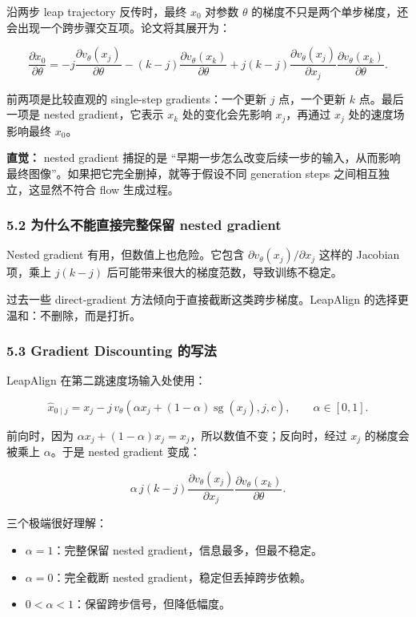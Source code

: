 沿两步 leap trajectory 反传时，最终 \(x_0\) 对参数 \(\theta\) 的梯度不只是两个单步梯度，还会出现一个跨步骤交互项。论文将其展开为：

\[
\frac{\partial x_0}{\partial \theta}
=
- j\frac{\partial v_{\theta}(x_j)}{\partial \theta}
-
(k-j)\frac{\partial v_{\theta}(x_k)}{\partial \theta}
+
j(k-j)
\frac{\partial v_{\theta}(x_j)}{\partial x_j}
\frac{\partial v_{\theta}(x_k)}{\partial \theta}.
\]

前两项是比较直观的 single-step gradients：一个更新 \(j\) 点，一个更新 \(k\) 点。最后一项是 nested gradient，它表示 \(x_k\) 处的变化会先影响 \(x_j\)，再通过 \(x_j\) 处的速度场影响最终 \(x_0\)。

\begin{intubox}
\textbf{直觉：} nested gradient 捕捉的是 ``早期一步怎么改变后续一步的输入，从而影响最终图像''。如果把它完全删掉，就等于假设不同 generation steps 之间相互独立，这显然不符合 flow 生成过程。
\end{intubox}

\subsubsection{5.2 为什么不能直接完整保留 nested gradient}

Nested gradient 有用，但数值上也危险。它包含 \(\partial v_{\theta}(x_j)/\partial x_j\) 这样的 Jacobian 项，乘上 \(j(k-j)\) 后可能带来很大的梯度范数，导致训练不稳定。

过去一些 direct-gradient 方法倾向于直接截断这类跨步梯度。LeapAlign 的选择更温和：不删除，而是打折。

\subsubsection{5.3 Gradient Discounting 的写法}

LeapAlign 在第二跳速度场输入处使用：

\[
\hat{x}_{0\mid j}
=
x_j
-
j\,v_{\theta}\left(
\alpha x_j + (1-\alpha)\operatorname{sg}(x_j), j, c
\right),
\qquad \alpha\in[0,1].
\]

前向时，因为 \(\alpha x_j+(1-\alpha)x_j=x_j\)，所以数值不变；反向时，经过 \(x_j\) 的梯度会被乘上 \(\alpha\)。于是 nested gradient 变成：

\[
\alpha\,j(k-j)
\frac{\partial v_{\theta}(x_j)}{\partial x_j}
\frac{\partial v_{\theta}(x_k)}{\partial \theta}.
\]

三个极端很好理解：

\begin{itemize}[leftmargin=1.5em]
  \item \(\alpha=1\)：完整保留 nested gradient，信息最多，但最不稳定。
  \item \(\alpha=0\)：完全截断 nested gradient，稳定但丢掉跨步依赖。
  \item \(0<\alpha<1\)：保留跨步信号，但降低幅度。
\end{itemize}

